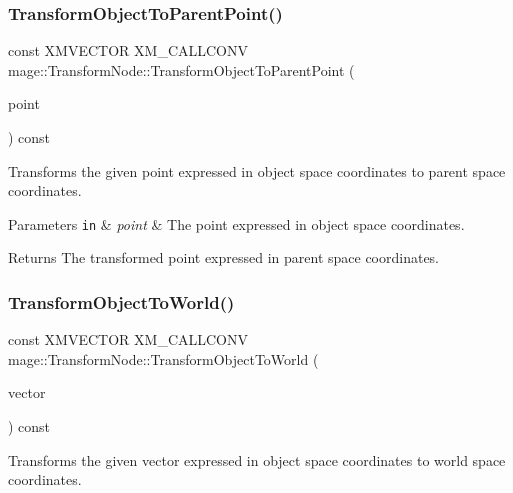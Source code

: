 \subsubsection{\texorpdfstring{Transform\+Object\+To\+Parent\+Point()}{TransformObjectToParentPoint()}}
{\footnotesize\ttfamily const X\+M\+V\+E\+C\+T\+OR X\+M\+\_\+\+C\+A\+L\+L\+C\+O\+NV mage\+::\+Transform\+Node\+::\+Transform\+Object\+To\+Parent\+Point (\begin{DoxyParamCaption}\item[{F\+X\+M\+V\+E\+C\+T\+OR}]{point }\end{DoxyParamCaption}) const\hspace{0.3cm}{\ttfamily [noexcept]}}

Transforms the given point expressed in object space coordinates to parent space coordinates.


\begin{DoxyParams}[1]{Parameters}
\mbox{\tt in}  & {\em point} & The point expressed in object space coordinates. \\
\hline
\end{DoxyParams}
\begin{DoxyReturn}{Returns}
The transformed point expressed in parent space coordinates. 
\end{DoxyReturn}
\hypertarget{structmage_1_1_transform_node_a93cad83498de7702b0c888260862ec39}{}\label{structmage_1_1_transform_node_a93cad83498de7702b0c888260862ec39} 
\subsubsection{\texorpdfstring{Transform\+Object\+To\+World()}{TransformObjectToWorld()}}
{\footnotesize\ttfamily const X\+M\+V\+E\+C\+T\+OR X\+M\+\_\+\+C\+A\+L\+L\+C\+O\+NV mage\+::\+Transform\+Node\+::\+Transform\+Object\+To\+World (\begin{DoxyParamCaption}\item[{F\+X\+M\+V\+E\+C\+T\+OR}]{vector }\end{DoxyParamCaption}) const\hspace{0.3cm}{\ttfamily [noexcept]}}

Transforms the given vector expressed in object space coordinates to world space coordinates.


